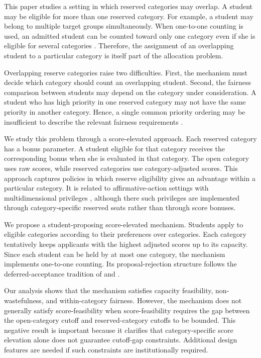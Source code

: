 \documentclass[10pt]{article}
\newcommand{\1}{\mathbf{1}}
\begin{document}
This paper studies a setting in which reserved categories may overlap. A student may be eligible for more than one reserved category. For example, a student may belong to multiple target groups simultaneously. When one-to-one counting is used, an admitted student can be counted toward only one category even if she is eligible for several categories \citep{AyBo21a,KHIY17a}. Therefore, the assignment of an overlapping student to a particular category is itself part of the allocation problem.

Overlapping reserve categories raise two difficulties. First, the mechanism must decide which category should count an overlapping student. Second, the fairness comparison between students may depend on the category under consideration. A student who has high priority in one reserved category may not have the same priority in another category. Hence, a single common priority ordering may be insufficient to describe the relevant fairness requirements \citep{KHIY17a,GKK+17a}.

We study this problem through a score-elevated approach. Each reserved category has a bonus parameter. A student eligible for that category receives the corresponding bonus when she is evaluated in that category. The open category uses raw scores, while reserved categories use category-adjusted scores. This approach captures policies in which reserve eligibility gives an advantage within a particular category. It is related to affirmative-action settings with multidimensional privileges \citep{AyBo21a}, although there such privileges are implemented through category-specific reserved seats rather than through score bonuses.

We propose a student-proposing score-elevated mechanism. Students apply to eligible categories according to their preferences over categories. Each category tentatively keeps applicants with the highest adjusted scores up to its capacity. Since each student can be held by at most one category, the mechanism implements one-to-one counting. Its proposal-rejection structure follows the deferred-acceptance tradition of \citet{GaSh62a} and \citet{Roth08a}.

Our analysis shows that the mechanism satisfies capacity feasibility, non-wastefulness, and within-category fairness. However, the mechanism does not generally satisfy score-feasibility when score-feasibility requires the gap between the open-category cutoff and reserved-category cutoffs to be bounded. This negative result is important because it clarifies that category-specific score elevation alone does not guarantee cutoff-gap constraints. Additional design features are needed if such constraints are institutionally required.
\end{document}
